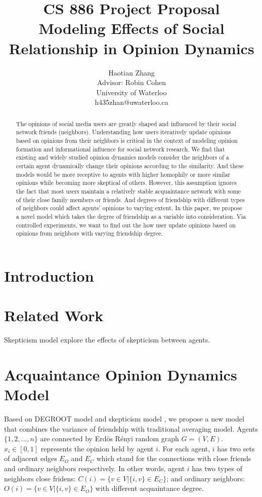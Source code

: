 \documentclass[11pt]{article}
\title{CS 886 Project Proposal\\Modeling Effects of Social Relationship in Opinion Dynamics}
\author{Haotian Zhang\\Advisor: Robin Cohen\\University of Waterloo\\h435zhan@uwaterloo.ca}
\date{}
\theoremstyle{definition}
\theoremstyle{basic}
\begin{document}
\maketitle

\begin{abstract}
The opinions of social media users are greatly shaped and influenced
by their social network friends (neighbors). Understanding how users
iteratively update opinions based on opinions from their neighbors 
is critical in the context of modeling opinion formation and informational influence for social network research.
We find that existing and widely studied opinion dynamics models
consider the neighbors of a certain agent dynamically change their opinions according to the similarity. And these models would
be more receptive to agents with higher homophily
or more similar opinions while becoming more skeptical of others. However, this assumption ignores the fact that most users maintain a relatively stable acquaintance
network with some of their close family members or friends. And degrees of friendship with different types of neighbors could affect agents' opinions to varying extent. In this
paper, we propose a novel model which takes the degree of friendship as 
a variable into consideration. Via controlled experiments,
we want to find out the how user update opinions based on opinions from
neighbors with varying friendship degree.

\end{abstract}

\section{Introduction}

\section{Related Work}
\cite{tsang2014opinion} Skepticism model explore the effects of skepticism between agents.

\section{Acquaintance Opinion Dynamics Model}
Based on DEGROOT model \cite{das2014modeling} and skepticism model \cite{tsang2014opinion}, we propose a new model that combines the variance of friendship with traditional averaging model. Agents $\{1,2,...,n\}$ are connected by Erd\"{o}s R\'{e}nyi random graph $G=(V,E)$. $x_i \in [0,1]$ represents the opinion held by agent $i$. For each agent, $i$ has two sets of adjacent edges $E_O$ and $E_C$ which stand for the connections with close friends and ordinary neighbors respectively. In other words, agent $i$ has two types of neighbors close fridens: $C(i)=\{v \in V|\{i,v\}\in E_C\}$; and ordinary neighbors: $O(i)=\{v \in V|\{i,v\}\in E_O\}$ with different acquaintance degree. 
\end{document}
